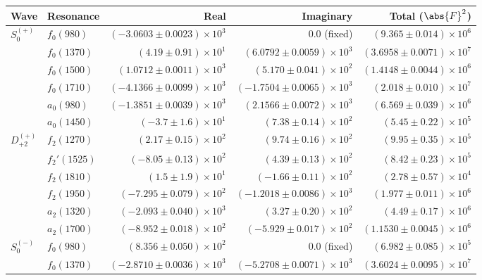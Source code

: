 \begin{table}[h]
    \begin{center}
        \begin{tabular}{llrrr}\toprule
        Wave & Resonance & Real & Imaginary & Total ($\abs{F}^2$) \\\midrule
$S_{0}^{(+)}$ & $f_{0}(980)$ & $(-3.0603 \pm 0.0023) \times 10^{3}$ & $0.0$ (fixed) & $(9.365 \pm 0.014) \times 10^{6}$ \\
 & $f_{0}(1370)$ & $(4.19 \pm 0.91) \times 10^{1}$ & $(6.0792 \pm 0.0059) \times 10^{3}$ & $(3.6958 \pm 0.0071) \times 10^{7}$ \\
 & $f_{0}(1500)$ & $(1.0712 \pm 0.0011) \times 10^{3}$ & $(5.170 \pm 0.041) \times 10^{2}$ & $(1.4148 \pm 0.0044) \times 10^{6}$ \\
 & $f_{0}(1710)$ & $(-4.1366 \pm 0.0099) \times 10^{3}$ & $(-1.7504 \pm 0.0065) \times 10^{3}$ & $(2.018 \pm 0.010) \times 10^{7}$ \\
 & $a_{0}(980)$ & $(-1.3851 \pm 0.0039) \times 10^{3}$ & $(2.1566 \pm 0.0072) \times 10^{3}$ & $(6.569 \pm 0.039) \times 10^{6}$ \\
 & $a_{0}(1450)$ & $(-3.7 \pm 1.6) \times 10^{1}$ & $(7.38 \pm 0.14) \times 10^{2}$ & $(5.45 \pm 0.22) \times 10^{5}$ \\
$D_{+2}^{(+)}$ & $f_{2}(1270)$ & $(2.17 \pm 0.15) \times 10^{2}$ & $(9.74 \pm 0.16) \times 10^{2}$ & $(9.95 \pm 0.35) \times 10^{5}$ \\
 & $f_{2}'(1525)$ & $(-8.05 \pm 0.13) \times 10^{2}$ & $(4.39 \pm 0.13) \times 10^{2}$ & $(8.42 \pm 0.23) \times 10^{5}$ \\
 & $f_{2}(1810)$ & $(1.5 \pm 1.9) \times 10^{1}$ & $(-1.66 \pm 0.11) \times 10^{2}$ & $(2.78 \pm 0.57) \times 10^{4}$ \\
 & $f_{2}(1950)$ & $(-7.295 \pm 0.079) \times 10^{2}$ & $(-1.2018 \pm 0.0086) \times 10^{3}$ & $(1.977 \pm 0.011) \times 10^{6}$ \\
 & $a_{2}(1320)$ & $(-2.093 \pm 0.040) \times 10^{3}$ & $(3.27 \pm 0.20) \times 10^{2}$ & $(4.49 \pm 0.17) \times 10^{6}$ \\
 & $a_{2}(1700)$ & $(-8.952 \pm 0.018) \times 10^{2}$ & $(-5.929 \pm 0.017) \times 10^{2}$ & $(1.1530 \pm 0.0045) \times 10^{6}$ \\
$S_{0}^{(-)}$ & $f_{0}(980)$ & $(8.356 \pm 0.050) \times 10^{2}$ & $0.0$ (fixed) & $(6.982 \pm 0.085) \times 10^{5}$ \\
 & $f_{0}(1370)$ & $(-2.8710 \pm 0.0036) \times 10^{3}$ & $(-5.2708 \pm 0.0071) \times 10^{3}$ & $(3.6024 \pm 0.0095) \times 10^{7}$ \\

\end{tabular}
\end{center}
\end{table}
